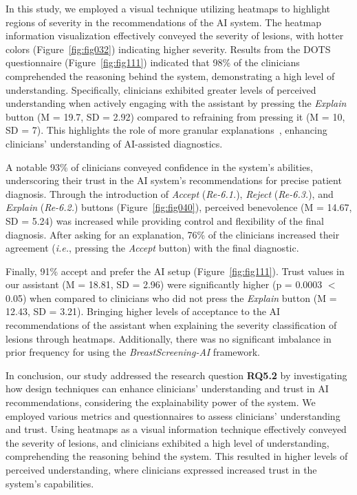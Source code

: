 In this study, we employed a visual technique utilizing heatmaps to highlight regions of severity in the recommendations of the \ac{AI} system.
The heatmap information visualization effectively conveyed the severity of lesions, with hotter colors (Figure~\ref{fig:fig032}) indicating higher severity.
Results from the \ac{DOTS} questionnaire (Figure~\ref{fig:fig111}) indicated that 98\% of the clinicians comprehended the reasoning behind the system, demonstrating a high level of understanding.
Specifically, clinicians exhibited greater levels of perceived understanding when actively engaging with the assistant by pressing the {\it Explain} button (M = 19.7, SD = 2.92) compared to refraining from pressing it (M = 10, SD = 7).
This highlights the role of more granular explanations~\cite{10.1145/3544548.3580945}, enhancing clinicians' understanding of \ac{AI}-assisted diagnostics.

A notable 93\% of clinicians conveyed confidence in the system's abilities, underscoring their trust in the \ac{AI} system's recommendations for precise patient diagnosis.
Through the introduction of {\it Accept} ({\it Re-6.1.}), {\it Reject} ({\it Re-6.3.}), and {\it Explain} ({\it Re-6.2.}) buttons (Figure~\ref{fig:fig040}), perceived benevolence (M = 14.67, SD = 5.24) was increased while providing control and flexibility of the final diagnosis.
After asking for an explanation, 76\% of the clinicians increased their agreement ({\it i.e.}, pressing the {\it Accept} button) with the final diagnostic.

Finally, 91\% accept and prefer the \ac{AI} setup (Figure~\ref{fig:fig111}).
Trust values in our assistant (M = 18.81, SD = 2.96) were significantly higher (p = 0.0003 $<$ 0.05) when compared to clinicians who did not press the {\it Explain} button (M = 12.43, SD = 3.21).
Bringing higher levels of acceptance to the \ac{AI} recommendations of the assistant when explaining the severity classification of lesions through heatmaps.
Additionally, there was no significant imbalance in prior frequency for using the {\it BreastScreening-AI} framework.

In conclusion, our study addressed the research question {\bf RQ5.2} by investigating how design techniques can enhance clinicians' understanding and trust in \ac{AI} recommendations, considering the explainability power of the system.
We employed various metrics and questionnaires to assess clinicians' understanding and trust.
Using heatmaps as a visual information technique effectively conveyed the severity of lesions, and clinicians exhibited a high level of understanding, comprehending the reasoning behind the system.
This resulted in higher levels of perceived understanding, where clinicians expressed increased trust in the system's capabilities.

